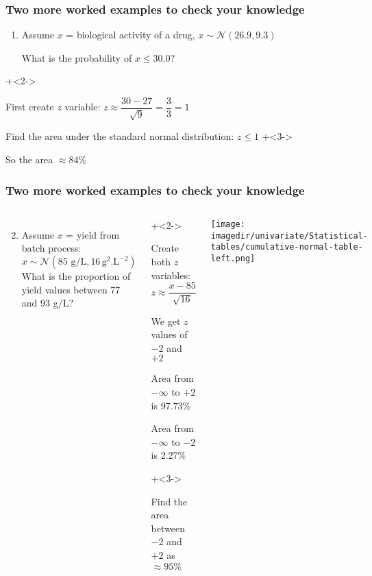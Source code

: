 \begin{frame}\frametitle{Two more worked examples to check your knowledge}
	\begin{enumerate}
		\item	Assume $x$ = biological activity of a drug, $x \sim \mathcal{N}(26.9, 9.3)$ 
				
				\vspace{12pt}
				What is the probability of $x \leq 30.0$?
	\end{enumerate}
	\vspace{24pt}
\onslide+<2->{	
	\begin{itemize}
		\item	First create $z$ variable: $z \approx \dfrac{30 - 27}{\sqrt{9}} = \dfrac{3}{3} = 1$
		\item	Find the area under the standard normal distribution: $z \leq 1$
		\onslide+<3->{
			\item	So the area $\approx 84\%$
		}
	\end{itemize}
}
\end{frame}

\begin{frame}\frametitle{Two more worked examples to check your knowledge}
	\begin{columns}[T]
		
		\column{0.7\textwidth}
			\begin{enumerate}
					\setcounter{enumi}{1}
		
					\item	Assume $x$ = yield from batch process:
						$$x \sim \mathcal{N}(85 \text{~g/L}, 16\, \text{g}^2\text{.L}^{-2})$$
						What is the proportion of yield values between 77 and 93 g/L?
			\end{enumerate}
			\vspace{24pt}
			\begin{itemize}
				\onslide+<2->{
					\item	Create both $z$ variables: $z \approx \dfrac{x - 85}{\sqrt{16}}$
					\item	We get $z$ values of $-2$ and $+2$			
					\item	Area from $-\infty$ to $+2$ is 97.73\%
					\item	Area from $-\infty$ to $-2$ is 2.27\%
				}
				\onslide+<3->{
					\item	Find the area between $-2$ and $+2$ as $\approx 95\%$
				}
			\end{itemize}

			\texttt{[image: \\imagedir/univariate/Statistical-tables/cumulative-normal-table-left.png]}
	\end{columns}
	
	
\end{frame}

